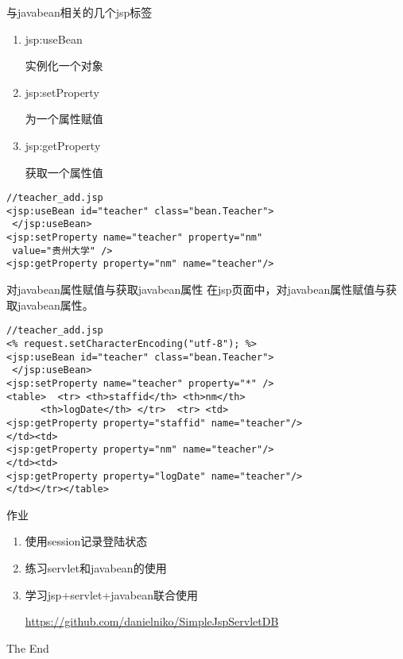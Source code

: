 \documentclass{beamer}
\begin{document}
\begin{frame}[fragile]{与javabean相关的几个jsp标签}
\begin{enumerate}
\item
jsp:useBean

实例化一个对象
\item
jsp:setProperty

为一个属性赋值
\item
jsp:getProperty

获取一个属性值
\end{enumerate}
\begin{lstlisting}
//teacher_add.jsp
<jsp:useBean id="teacher" class="bean.Teacher">
 </jsp:useBean>
<jsp:setProperty name="teacher" property="nm"
 value="贵州大学" />
<jsp:getProperty property="nm" name="teacher"/>

\end{lstlisting}

\end{frame}

\begin{frame}[fragile]{对javabean属性赋值与获取javabean属性}
在jsp页面中，对javabean属性赋值与获取javabean属性。
\begin{lstlisting}
//teacher_add.jsp
<% request.setCharacterEncoding("utf-8"); %>
<jsp:useBean id="teacher" class="bean.Teacher">
 </jsp:useBean>
<jsp:setProperty name="teacher" property="*" />
<table>  <tr> <th>staffid</th> <th>nm</th> 
      <th>logDate</th> </tr>  <tr> <td>
<jsp:getProperty property="staffid" name="teacher"/>
</td><td>
<jsp:getProperty property="nm" name="teacher"/>
</td><td>
<jsp:getProperty property="logDate" name="teacher"/>
</td></tr></table>
\end{lstlisting}

\end{frame}

\begin{frame}{作业}
\begin{enumerate}
\item
使用session记录登陆状态
\item
练习servlet和javabean的使用
\item
学习jsp+servlet+javabean联合使用

\url{https://github.com/danielniko/SimpleJspServletDB}
\end{enumerate}
\end{frame}

\begin{frame}
\Huge{\centerline{The End}}
\end{frame}
\end{document}
